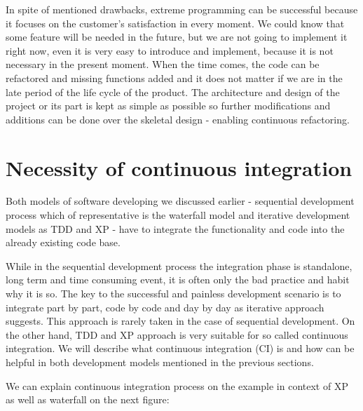 \documentclass[12pt,final,oneside]{fithesis}
\begin{document}
In spite of mentioned drawbacks, extreme programming can be successful because it focuses on the customer's satisfaction in every moment. We could know that some feature will be needed in the future, but we are not going to implement it right now, even it is very easy to introduce and implement, because it is not necessary in the present moment. When the time comes, the code can be refactored and missing functions added and it does not matter if we are in the late period of the life cycle of the product. The architecture and design of the project or its part is kept as simple as possible so further modifications and additions can be done over the skeletal design - enabling continuous refactoring.

	\section{Necessity of continuous integration}
	
Both models of software developing we discussed earlier - sequential development process which of representative is the waterfall model and iterative development models as TDD and XP - have to integrate the functionality and code into the already existing code base.

While in the sequential development process the integration phase is standalone, long term and time consuming event, it is often only the bad practice and habit why it is so. The key to the successful and painless development scenario is to integrate part by part, code by code and day by day as iterative approach suggests. This approach is rarely taken in the case of sequential development. On the other hand, TDD and XP approach is very suitable for so called continuous integration. We will describe what continuous integration (CI) is and how can be helpful in both development models mentioned in the previous sections.

We can explain continuous integration process on the example in context of XP as well as waterfall on the next figure:
\end{document}
